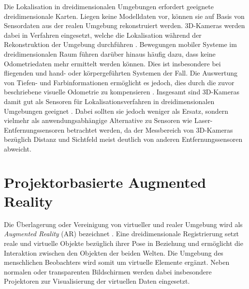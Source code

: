 Die Lokalisation in dreidimensionalen Umgebungen erfordert geeignete dreidimensionale Karten. Liegen keine Modelldaten vor, können sie auf Basis von Sensordaten aus der realen Umgebung rekonstruiert werden. 3D-Kameras werden dabei in Verfahren eingesetzt, welche die Lokalisation während der Rekonstruktion der Umgebung durchführen \cite{Durrant2006}. Bewegungen mobiler Systeme im dreidimensionalen Raum führen darüber hinaus häufig dazu, dass keine Odometriedaten mehr ermittelt werden können. Dies ist insbesondere bei fliegenden \cite{Huang2011} und hand- oder körpergeführten Systemen \cite{Fallon2012} der Fall. Die Auswertung von Tiefen- und Farbinformationen ermöglicht es jedoch, dies durch die zuvor beschriebene visuelle Odometrie zu kompensieren \cite{Whelan2013robust}. Insgesamt sind 3D-Kameras damit gut als Sensoren für Lokalisationsverfahren in dreidimensionalen Umgebungen geeignet \cite{Cunha2011} \cite{Eriksson2012}. Dabei sollten sie jedoch weniger als Ersatz, sondern vielmehr als anwendungsabhängige Alternative zu Sensoren wie Laser-Entfernungssensoren betrachtet werden, da der Messbereich von 3D-Kameras bezüglich Distanz und Sichtfeld meist deutlich von anderen Entfernungssensoren abweicht.

\section{Projektorbasierte Augmented Reality}
Die Überlagerung oder Vereinigung von virtueller und realer Umgebung wird als \textit{Augmented Reality} (AR) bezeichnet \cite{Azuma1997}. Eine dreidimensionale Registrierung setzt reale und virtuelle Objekte bezüglich ihrer Pose in Beziehung und ermöglicht die Interaktion zwischen den Objekten der beiden Welten. Die Umgebung des menschlichen Beobachters wird somit um virtuelle Elemente ergänzt. Neben normalen oder transparenten Bildschirmen werden dabei insbesondere Projektoren zur Visualisierung der virtuellen Daten eingesetzt.\\


